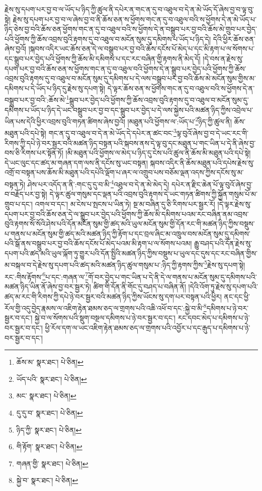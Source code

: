 རྗེས་སུ་དཔག་པར་བྱ་བ་ལ་ཡོད་པ་ཉིད་ཀྱི་ཚུལ་ནི་དཔེར་ན་གང་ན་དུ་བ་འཐུལ་བ་དེ་ན་མེ་ཡོད་དོ་ཞེས་བྱ་བ་ལྟ་བུ་སྟེ། རྗེས་སུ་དཔག་པར་བྱ་བ་ལ་ཞེས་བྱ་བ་ནི་ཆོས་ཅན་ས་ཕྱོགས་གང་ན་དུ་བ་འཐུལ་བའི་ས་ཕྱོགས་དེ་ན་མེ་ཡོད་པ་ཉིད་ཅེས་བྱ་བའི་ཆོས་ཅན་ཕྱོགས་གང་ན་དུ་བ་འཐུལ་བའི་ས་ཕྱོགས་དེ་ན་བསྒྲུབ་པར་བྱ་བའི་ཆོས་མེ་གྲུབ་པར་བྱེད་པའི་ཕྱོགས་ཀྱི་ཆོས་འབྲས་བུའི་རྟགས་དུ་བ་འཐུལ་བ་མངོན་སུམ་དུ་དམིགས་པ་ཡོད་པ་ཉིད་དེ། དེའི་ཕྱིར་ཆོས་ཅན་ཞེས་བྱའོ། །སྐབས་འདིར་ཡང་ཆོས་ཅན་དེ་ལ་བསྒྲུབ་པར་བྱ་བའི་ཆོས་དངོས་པོ་མེད་པ་དང་མི་རྟག་པ་ལ་སོགས་པ་དང་སྒྲུབ་པར་བྱེད་པའི་ཕྱོགས་ཀྱི་ཆོས་མི་དམིགས་པ་དང་རང་བཞིན་གྱི་རྟགས་ནི་མེད་དོ། །དེ་བས་ན་རྗེས་སུ་དཔག་པར་བྱ་བའི་ཆོས་ཅན་ས་ཕྱོགས་གང་ན་དུ་བ་འཐུལ་བའི་ཕྱོགས་དེ་ན་སྒྲུབ་པར་བྱེད་པའི་ཕྱོགས་ཀྱི་ཆོས་འབྲས་བུའི་རྟགས་དུ་བ་འཐུལ་བ་མངོན་སུམ་དུ་དམིགས་པ་དེ་ལས་བསྒྲུབ་པར་བྱ་བའི་ཆོས་མེ་མངོན་སུམ་གྱིས་མ་དམིགས་པ་དེ་ཡོད་པ་ཉིད་དུ་རྗེས་སུ་དཔག་སྟེ། དེ་ལྟར་ཆོས་ཅན་ས་ཕྱོགས་གང་ན་དུ་བ་འཐུལ་བའི་ས་ཕྱོགས་དེ་ན་བསྒྲུབ་པར་བྱ་བའི་:ཆོས་མེ་\footnote{ཆོས་མ་  སྣར་ཐང་།  པེ་ཅིན། }སྒྲུབ་པར་བྱེད་པའི་ཕྱོགས་ཀྱི་ཆོས་འབྲས་བུའི་རྟགས་དུ་བ་འཐུལ་བ་མངོན་སུམ་དུ་དམིགས་པ་ཡོད་པ་ཉིད་དེ་ཡང་བསྒྲུབ་པར་བྱ་བ་དང་སྒྲུབ་པར་བྱེད་པ་དེ་ལས་སྐྱེས་པའི་མཚན་ཉིད་ཀྱིས་འབྲེལ་པ་ཡིན་པས་དེའི་ཕྱིར་འབྲས་བུའི་གཏན་ཚིགས་ཞེས་བྱའོ། །མཐུན་པའི་ཕྱོགས་ལ་:ཡོད་པ་\footnote{ཡོད་པའི་  སྣར་ཐང་།  པེ་ཅིན། }ཉིད་ཀྱི་ཚུལ་ནི། ཆོས་མཐུན་པའི་དཔེ་སྟེ། གང་ན་དུ་བ་འཐུལ་བ་དེ་ན་མེ་ཡོད་དེ་དཔེར་ན་ཚང་བང་\footnote{མང་  སྣར་ཐང་།  པེ་ཅིན། }ལྟ་བུའོ་ཞེས་བྱ་བ་དེ་ཡང་རང་གི་རིགས་ཀྱི་དཔེ་ཉེ་བར་སྦྱར་བའི་མཚན་ཉིད་བསྟན་པའི་སྐབས་ནས་དེ་ལྟ་བུ་དང་མཐུན་པ་གང་ཡིན་པ་དེ་ནི་ཞེས་བྱ་བས་ཅི་རིགས་པར་སྟོན་ཏོ། །མི་མཐུན་པའི་ཕྱོགས་ལ་མེད་པ་ཉིད་དུ་ངེས་པའི་ཚུལ་ནི་ཆོས་མི་མཐུན་པའི་དཔེ་སྟེ། དེ་ཡང་ལུང་དང་ཚད་མ་གཞན་དག་ལས་ནི་དངོས་སུ་ཡང་བསྟན། སྐབས་འདིར་ནི་ཆོས་མཐུན་པའི་དཔེས་རྗེས་སུ་འགྲོ་བ་བསྟན་པས་ཆོས་མི་མཐུན་པའི་དཔེའི་ལྡོག་པ་ཞར་ལ་འགྲུབ་པས་བཅོམ་ལྡན་འདས་ཀྱིས་དངོས་སུ་མ་བསྟན་ཏེ། ཤེས་པར་འདོད་ན་ནི་:གང་དུ་དུ་བ་མི་\footnote{དུ་དུ་བ་  སྣར་ཐང་།  པེ་ཅིན། }འཐུལ་བ་དེ་ན་མེ་མེད་དེ། དཔེར་ན་རྫིང་ཆེན་པོ་ལྟ་བུའོ་ཞེས་བྱ་བ་བརྗོད་པར་བྱ་སྟེ། དེ་ལྟར་ཚུལ་གསུམ་དང་ལྡན་པའི་འབྲས་བུའི་རྟགས་དེ་ཡང་གཏན་ཚིགས་ཀྱི་སྐྱོན་གསུམ་པོ་མ་གྲུབ་པ་དང་། འགལ་བ་དང་། མ་ངེས་པ་སྤངས་པ་ཡིན་ཏེ། སྔ་མ་བཞིན་དུ་ཅི་རིགས་པར་སྦྱར་རོ། །དེ་ལྟར་རྗེས་སུ་དཔག་པར་བྱ་བའི་ཆོས་ཅན་དེ་ལ་སྒྲུབ་པར་བྱེད་པའི་ཕྱོགས་ཀྱི་ཆོས་མི་དམིགས་པའམ་རང་བཞིན་ནམ་འབྲས་བུའི་རྟགས་སོ་སོའི་ཤེས་པའི་དོན་མངོན་སུམ་གྱི་ཚད་མའི་ཡུལ་མངོན་སུམ་གྱི་དོན་རང་གི་མཚན་ཉིད་ཀྱིས་བསྡུས་པ་གནས་པ་མངོན་སུམ་གྱི་ཚད་མའི་མཚན་ཉིད་ཀྱི་རྟོག་པ་དང་བྲལ་ཞིང་མ་འཁྲུལ་བས་མངོན་སུམ་དུ་དམིགས་པའི་སྒོ་ནས་བསྒྲུབ་པར་བྱ་བའི་ཆོས་དངོས་པོ་མེད་པའམ་མི་རྟག་པ་ལ་སོགས་པའམ། རྒྱུ་བཤད་པའི་དོན་རྗེས་སུ་དཔག་པའི་ཚད་མའི་ཡུལ་ལྐོག་ཏུ་གྱུར་པའི་དོན་སྤྱིའི་མཚན་ཉིད་ཀྱིས་བསྡུས་པ་ཡུལ་དང་དུས་དང་རང་བཞིན་གྱིས་མ་བསྐལ་བ་དེ་རྗེས་སུ་དཔག་པའི་ཚད་མའི་མཚན་ཉིད་ཚུལ་གསུམ་པ་:ཉིད་ཀྱི་རྟགས་ཀྱིས་\footnote{ཉིད་ཀྱི་  སྣར་ཐང་།  པེ་ཅིན། }རྗེས་སུ་དཔག་སྟེ། རང་:གིས་རྟོགས་\footnote{གི་རྟོག་  སྣར་ཐང་།  པེ་ཅིན། }པ་དང་:གཞན་ལ་\footnote{གཞན་གྱི་  སྣར་ཐང་།  པེ་ཅིན། }གོ་བར་བྱེད་པ་གང་ཡིན་པ་དེ་ནི་དེ་ལ་གནས་པ་མངོན་སུམ་དུ་དམིགས་པའི་མཚན་ཉིད་ཡིན་ནོ་ཞེས་བྱ་བར་སྦྱར་ཏེ། ཚིག་གི་དོན་ནི་གོང་དུ་བཤད་པ་བཞིན་ནོ། །དེའི་འོག་ཏུ་རྗེས་སུ་དཔག་པའི་ཚད་མ་རང་གི་རིགས་ཀྱི་དཔེ་ཉེ་བར་སྦྱར་བའི་མཚན་ཉིད་ཀྱིས་ཡོངས་སུ་དག་པར་བསྟན་པའི་ཕྱིར། ནང་དང་ཕྱི་རོལ་གྱི་འདུ་བྱེད་རྣམས་ལ་འཇིག་རྟེན་ཐམས་ཅད་ལ་གྲགས་པའི་འཆི་འཕོ་བ་དང་:སྐྱེ་བ་མི་\footnote{སྐྱེ་བ་  སྣར་ཐང་།  པེ་ཅིན། }དམིགས་པ་ཉེ་བར་སྦྱར་བ་དང་། སྐྱེ་བ་ལ་སོགས་པའི་སྡུག་བསྔལ་དམིགས་པ་ཉེ་བར་སྦྱར་བ་དང་། རང་དབང་མེད་པ་དམིགས་པ་ཉེ་བར་སྦྱར་བ་དང་། ཕྱི་རོལ་དག་ལ་ཡང་འཇིག་རྟེན་ཐམས་ཅད་ལ་གྲགས་པའི་འབྱོར་པ་དང་རྒུད་པ་དམིགས་པ་ཉེ་བར་སྦྱར་བ་དང་། 